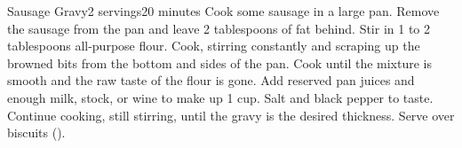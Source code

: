 \documentclass[../Cookbook.tex]{subfiles}
\begin{document}
\begin{recipe}[SausageGravy]{Sausage Gravy}{2 servings}{20 minutes}
	Cook some sausage in a large pan.
	Remove the sausage from the pan and leave 2 tablespoons of fat behind.
	Stir in 1 to 2 tablespoons all-purpose flour.
	Cook, stirring constantly and scraping up the browned bits from the bottom and sides of the pan.
	Cook until the mixture is smooth and the raw taste of the flour is gone.
	Add reserved pan juices and enough milk, stock, or wine to make up 1 cup.
	Salt and black pepper to taste.
	Continue cooking, still stirring, until the gravy is the desired thickness.
	Serve over biscuits ().
\end{recipe}
\end{document}

